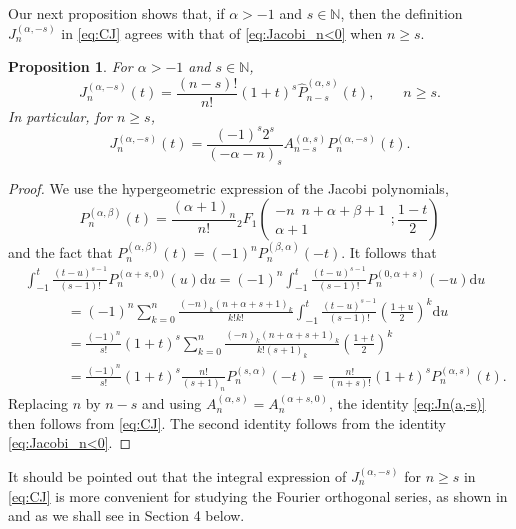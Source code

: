 \documentclass{amsart}
\newtheorem{prop}[thm]{Proposition}
\theoremstyle{remark}
\def\d{\mathrm{d}}
\def\a{{\alpha}}
\def\b{{\beta}}
\def\NN{{\mathbb N}}
\newcommand{\wh}{\widehat}
\begin{document}
Our next proposition shows that, if $\a > -1$ and $s\in \NN$, then the definition $J_n^{(\a,-s)}$ in
\eqref{eq:CJ} agrees with that of \eqref{eq:Jacobi_n<0} when $n\ge s$.

\begin{prop}
For $\a > -1$ and $s \in \NN$,
\begin{equation}\label{eq:Jn(a,-s)}
  J_n^{(\a,-s)} (t) = \frac{(n-s)!}{n!}  (1+t)^s \wh P_{n-s}^{(\a,s)}(t), \qquad n \ge s.
\end{equation}
In particular, for $n \ge s$,
\begin{equation}\label{eq:Jn(a,-s)=Pn}
  J_n^{(\a,-s)} (t) = \frac{(-1)^s 2^s}{(-\a-n)_s}A_{n-s}^{(\a,s)} P_n^{(\a,-s)}(t).
\end{equation}
\end{prop}

\begin{proof}
We use the hypergeometric expression of the Jacobi polynomials,
$$
P_n^{(\a,\b)}(t) = \frac{(\a+1)_n}{n!} {}_2F_1\left(\begin{matrix} -n \,\,\, n+\a+\b+1\\ \a+1 \end{matrix}; \frac{1-t}{2} \right)
$$
and the fact that $P_n^{(\a,\b)}(t) = (-1)^n P_n^{(\b,\a)}(-t)$. It follows that
\begin{align*}
 &  \int_{-1}^t \frac{(t-u)^{s-1}}{(s-1)!} P_n^{(\a+s,0)}(u) \d u
   = (-1)^n  \int_{-1}^t \frac{(t-u)^{s-1}}{(s-1)!} P_n^{(0, \a+s)}(-u) \d u \\
  & \qquad\quad = (-1)^n \sum_{k=0}^n \frac{(-n)_k (n+\a+s+1)_k}{k! k!}
   \int_{-1}^t \frac{(t-u)^{s-1}}{(s-1)!} \left(\frac{1+u}{2} \right)^k \d u \\
  & \qquad\quad = \frac{(-1)^n}{s!} (1+t)^s \sum_{k=0}^n \frac{(-n)_k (n+\a+s+1)_k}{k! (s+1)_k}  \left(\frac{1+t}{2} \right)^k \\
  & \qquad\quad = \frac{(-1)^n}{s!} (1+t)^s \frac{n!}{(s+1)_n} P_n^{(s,\a)}(-t)
     =   \frac{n!}{(n+s)!}  (1+t)^sP_n^{(\a,s)}(t).
 \end{align*}
Replacing $n$ by $n-s$ and using $A_n^{(\a,s)} = A_n^{(\a+s,0)}$, the identity \eqref{eq:Jn(a,-s)} then follows from
\eqref{eq:CJ}. The second identity follows from the identity \eqref{eq:Jacobi_n<0}.
\end{proof}

It should be pointed out that the integral expression of $J_n^{(\a,-s)}$ for $n \ge s$ in \eqref{eq:CJ} is more
convenient for studying the Fourier orthogonal series, as shown in \cite{X19} and as we shall see in
Section 4 below.
\end{document}
